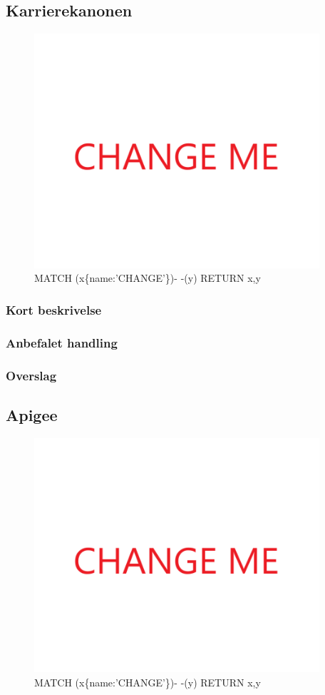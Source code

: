 \documentclass{article}
\begin{document}
\subsection{Karrierekanonen}
\begin{figure}[h]
\includegraphics[width=300pt]{CHANGE.PNG}
\caption{MATCH (x\{name:'CHANGE'\})- -(y) RETURN x,y}
\end{figure}
\subsubsection{Kort beskrivelse}
\subsubsection{Anbefalet handling}
\subsubsection{Overslag}


\subsection{Apigee}
\begin{figure}[h]
\includegraphics[width=300pt]{CHANGE.PNG}
\caption{MATCH (x\{name:'CHANGE'\})- -(y) RETURN x,y}
\end{figure}
\end{document}
